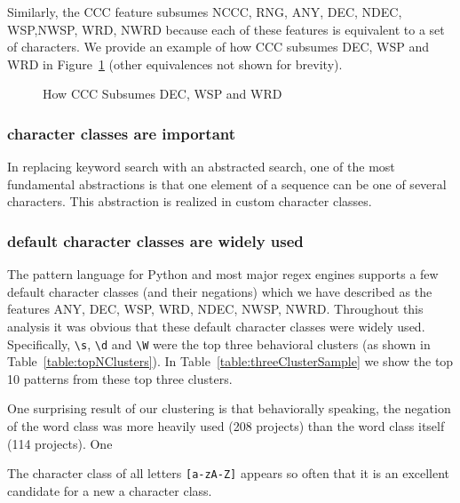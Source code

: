Similarly, the CCC feature subsumes NCCC, RNG, ANY, DEC, NDEC, WSP,NWSP, WRD, NWRD because each of these features is equivalent to a set of characters.  We provide an example of how CCC subsumes DEC, WSP and WRD in Figure~\ref{fig:CCCequivalences} (other equivalences not shown for brevity).

\begin{figure}[tb]
\centering
{}
\caption{How CCC Subsumes DEC, WSP and WRD}
\label{fig:CCCequivalences}
\end{figure}

\subsubsection{character classes are important}
In replacing keyword search with an abstracted search, one of the most fundamental abstractions is that one element of a sequence can be one of several characters.  This abstraction is realized in custom character classes.

\subsubsection{default character classes are widely used}

The pattern language for Python and most major regex engines supports a few default character classes (and their negations) which we have described as the features ANY, DEC, WSP, WRD, NDEC, NWSP, NWRD.  Throughout this analysis it was obvious that these default character classes were widely used. Specifically, \verb!\s!, \verb!\d! and \verb!\W! were the top three behavioral clusters (as shown in Table~\ref{table:topNClusters}).  In Table~\ref{table:threeClusterSample} we show the top 10 patterns from these top three clusters. 



One surprising result of our clustering is that behaviorally speaking, the negation of the word class was more heavily used (208 projects) than the word class itself (114 projects).  One

The character class of all letters \verb![a-zA-Z]! appears so often that it is an excellent candidate for a new a character class.

